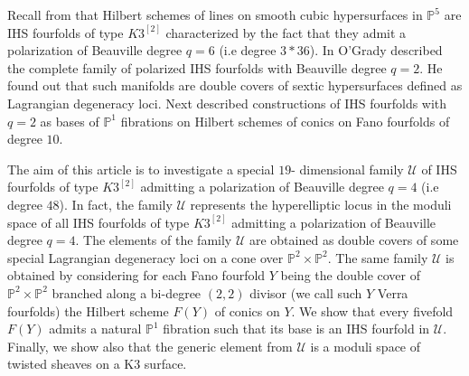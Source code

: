 \documentclass[a4paper,11pt]{amsart}
\theoremstyle{definition}
\numberwithin{equation}{section}
\numberwithin{equation}{section} \theoremstyle{definition}
\begin{document}
Recall from \cite{BD} that Hilbert schemes of lines on smooth cubic hypersurfaces in ${{\mathbb{P}}}^5$ are IHS fourfolds of  type $K3^{[2]}$
characterized by the fact that they admit a polarization of Beauville degree $q=6$ (i.e degree $3*36$).
In \cite{OgradyEPW} O'Grady described the complete family of polarized IHS fourfolds with Beauville degree $q=2$. He found out that such manifolds are double covers of sextic hypersurfaces defined as Lagrangian degeneracy loci. 
Next \cite{IM} described constructions of IHS fourfolds with $q=2$ as bases of ${{\mathbb{P}}}^1$ fibrations on Hilbert schemes of conics on Fano fourfolds of degree $10$.

The aim of this article is to investigate a special $19$- dimensional family $\mathcal{U}$ of IHS fourfolds of type $K3^{[2]}$ admitting a polarization of Beauville degree $q=4$ (i.e degree $48$). In fact, the family $\mathcal{U}$ represents the hyperelliptic locus in the moduli space of all  IHS fourfolds of type $K3^{[2]}$ admitting a polarization of Beauville degree $q=4$. The elements of the family $\mathcal{U}$ are obtained as double covers of some special Lagrangian degeneracy loci on a cone over $\mathbb{P}^2\times \mathbb{P}^2$.  The same family $\mathcal{U}$ is obtained by considering for each  Fano fourfold $Y$ being the double cover of ${{\mathbb{P}}}^2\times {{\mathbb{P}}}^2$ branched along a bi-degree $(2,2)$ divisor (we call such $Y$ Verra fourfolds)  the Hilbert scheme $F(Y)$ of conics on $Y$.
We show that every fivefold $F(Y)$ admits a natural ${{\mathbb{P}}}^1$ fibration such that its base is an IHS fourfold in $\mathcal{U}$. Finally, we show also that the generic element from $\mathcal{U}$ is a moduli space of twisted sheaves on a K3 surface.
\end{document}
